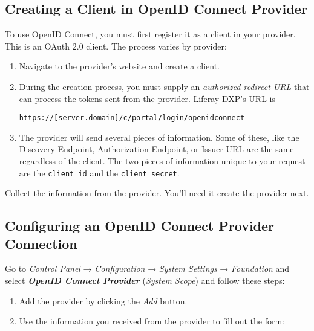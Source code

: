 \subsection{Creating a Client in OpenID Connect
Provider}\label{creating-a-client-in-openid-connect-provider}

To use OpenID Connect, you must first register it as a client in your
provider. This is an OAuth 2.0 client. The process varies by provider:

\begin{enumerate}
\def\labelenumi{\arabic{enumi}.}
\item
  Navigate to the provider's website and create a client.
\item
  During the creation process, you must supply an \emph{authorized
  redirect URL} that can process the tokens sent from the provider.
  Liferay DXP's URL is

\begin{verbatim}
https://[server.domain]/c/portal/login/openidconnect
\end{verbatim}
\item
  The provider will send several pieces of information. Some of these,
  like the Discovery Endpoint, Authorization Endpoint, or Issuer URL are
  the same regardless of the client. The two pieces of information
  unique to your request are the \texttt{client\_id} and the
  \texttt{client\_secret}.
\end{enumerate}

Collect the information from the provider. You'll need it create the
provider next.

\subsection{Configuring an OpenID Connect Provider
Connection}\label{configuring-an-openid-connect-provider-connection}

Go to \emph{Control Panel} → \emph{Configuration} → \emph{System
Settings} → \emph{Foundation} and select \textbf{\emph{OpenID Connect
Provider}} (\emph{System Scope}) and follow these steps:

\begin{enumerate}
\def\labelenumi{\arabic{enumi}.}
\item
  Add the provider by clicking the \emph{Add} button.
\item
  Use the information you received from the provider to fill out the
  form:
\end{enumerate}


